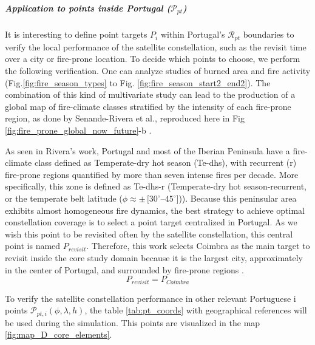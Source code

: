 \subparagraph{Application to points inside Portugal 
($\mathcal{P}_{pt}$)}\hspace{0pt}
\label{sec_pt_space_domain}
 
It is interesting to define point targets $P_i$ within Portugal's $\mathcal{R}_{pt}$ boundaries to verify the local performance of the satellite constellation, such as the revisit time over a city or fire-prone location. 
To decide which points to choose, we perform the following verification. One can analyze studies of burned area
and fire activity (Fig.\ref{fig:fire_season_types}  to  Fig. \ref{fig:fire_season_start2_end2}). The combination of this kind of multivariate study can lead to the production of a global map of fire-climate classes stratified by the intensity of each fire-prone region, as done by Senande-Rivera et al., reproduced here in Fig  \ref{fig:fire_prone_global_now_future}-b \cite{senande-rivera_spatial_2022}. 

As seen in Rivera's work, Portugal and most of the Iberian Peninsula have a fire-climate class defined as Temperate-dry hot season (Te-dhs), with recurrent (r) fire-prone regions quantified by more than seven intense fires per decade. More specifically, this zone is defined as Te-dhs-r (Temperate-dry hot season-recurrent, or the temperate belt latitude  ($\phi \approx \pm\,[30^{\circ}$--$45^{\circ}]$)). Because this peninsular area exhibits almost homogeneous fire dynamics, the best strategy to achieve optimal constellation coverage is to select a point target centralized in Portugal. As we wish this point to be revisited often by the satellite constellation, this central point is named $P_{revisit}$.
Therefore, this work selects Coimbra as the main target to revisit inside the core study domain because it is the largest city, approximately in the center of Portugal, and surrounded by fire-prone regions . 
\begin{equation}
    P_{revisit} = P_{Coimbra}
\end{equation}


To verify the satellite constellation performance in other relevant Portuguese i points $\mathcal{P}_{pt,i}(\phi, \lambda, h)$, the table \ref{tab:pt_coords} with geographical references will be used during the simulation. This points are visualized in the map \ref{fig:map_D_core_elements}.

